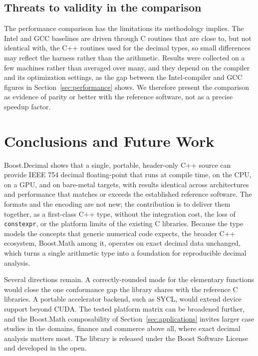 \documentclass[acmsmall]{acmart}
\begin{document}
\subsection{Threats to validity in the comparison}
The performance comparison has the limitations its methodology implies. The Intel and GCC
baselines are driven through C routines that are close to, but not identical with, the C++
routines used for the decimal types, so small differences may reflect the harness rather
than the arithmetic. Results were collected on a few machines rather than averaged over
many, and they depend on the compiler and its optimization settings, as the gap between
the Intel-compiler and GCC figures in Section~\ref{sec:performance} shows. We therefore
present the comparison as evidence of parity or better with the reference software, not as
a precise speedup factor.

\section{Conclusions and Future Work}
\label{sec:conclusion}

Boost.Decimal shows that a single, portable, header-only C++ source can provide IEEE 754
decimal floating-point that runs at compile time, on the CPU, on a GPU, and on bare-metal
targets, with results identical across architectures and performance that matches or
exceeds the established reference software. The formats and the encoding are not new; the
contribution is to deliver them together, as a first-class C++ type, without the
integration cost, the loss of \texttt{constexpr}, or the platform limits of the existing C
libraries. Because the type models the concepts that generic numerical code expects, the
broader C++ ecosystem, Boost.Math among it, operates on exact decimal data unchanged, which
turns a single arithmetic type into a foundation for reproducible decimal analysis.

Several directions remain. A correctly-rounded mode for the elementary functions would close
the one conformance gap the library shares with the reference C libraries. A portable
accelerator backend, such as SYCL, would extend device support beyond CUDA. The tested
platform matrix can be broadened further, and the Boost.Math composability of
Section~\ref{sec:applications} invites larger case studies in the domains, finance and
commerce above all, where exact decimal analysis matters most. The library is released under
the Boost Software License and developed in the open.
\end{document}
